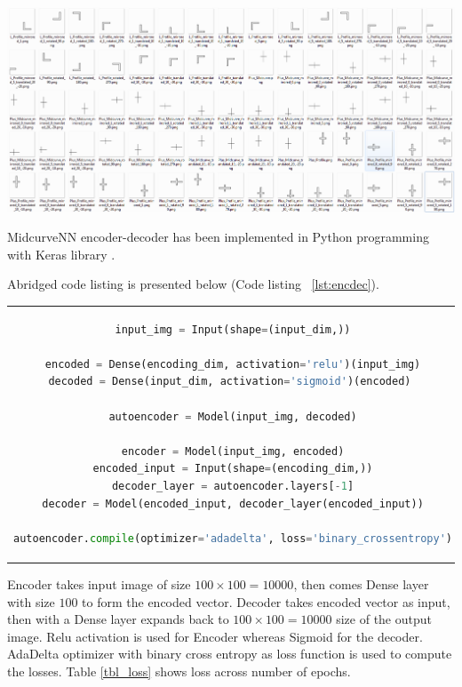 \documentclass[9pt,academicons]{article}
\begin{document}
     \begin{center}
	\includegraphics[width=\linewidth]{images/training_data}
	\label{fig_training}
    \end{center}
    
MidcurveNN encoder-decoder has been implemented in Python programming with Keras library \cite{autoenkeras}.  

Abridged code listing is presented below (Code listing ~\ref{lst:encdec}).

\begin{center}
\begin{tabular}{c}
\begin{lstlisting}[language=Python, caption=Encoder-Decoder,label={lst:encdec},frame=single]
input_img = Input(shape=(input_dim,))
    
encoded = Dense(encoding_dim, activation='relu')(input_img)
decoded = Dense(input_dim, activation='sigmoid')(encoded) 
    
autoencoder = Model(input_img, decoded)
            
encoder = Model(input_img, encoded)
encoded_input = Input(shape=(encoding_dim,))
decoder_layer = autoencoder.layers[-1]
decoder = Model(encoded_input, decoder_layer(encoded_input))
    
autoencoder.compile(optimizer='adadelta', loss='binary_crossentropy')
\end{lstlisting}	
\end{tabular}
\end{center}

Encoder takes input image of size $100 \times 100 = 10000$, then comes Dense layer with size $100$ to form the encoded vector. Decoder takes encoded vector as input, then with a Dense layer expands back to $100 \times 100 = 10000$ size of the output image. Relu activation is used for Encoder whereas Sigmoid for the decoder. AdaDelta optimizer with binary cross entropy as loss function is used to compute the losses. Table \ref{tbl_loss} shows loss across number of epochs.    
\end{document}
